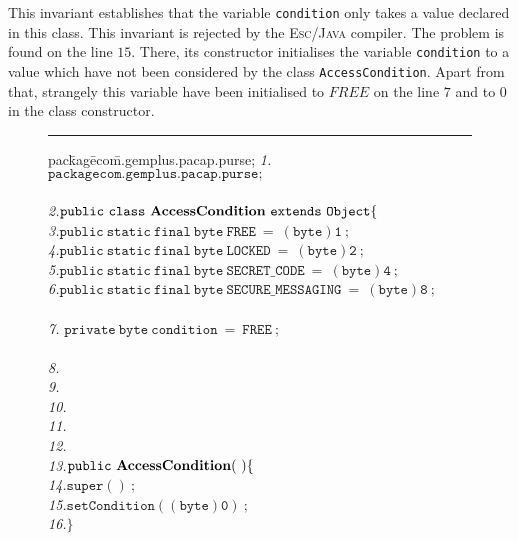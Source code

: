 \documentclass[a4paper]{llncs}
\begin{document}
This invariant establishes that the variable \texttt{condition} only
takes a value declared in this class. This invariant is rejected by
the \textsc{Esc/Java} compiler. The problem is found on the line
$15$. There, its constructor initialises the variable
\texttt{condition} to a value which have not been considered by the
class \texttt{AccessCondition}. Apart from that, strangely this
variable have been initialised to $FREE$ on the line $7$ and to $0$
in the class constructor.




\begin{center}
\begin{figure}[hbt]
\rule{\linewidth}{0.3mm}
\rule{0em}{0.1ex}
\begin{tabbing} 
pac\=kag\=eco\=m.gemplus.pacap.purse; \kill 
\emph{1.}\>$\mathtt{package com.gemplus.pacap.purse;}$\\
\\
\emph{2.}\>$\mathtt{public\ class\ {\bf AccessCondition}\ extends\ Object\{}$\\

\emph{3.}\>\>$\mathtt{public\ static\ final\ byte\ FREE\		=\ (byte)1\ ;}$\\
\emph{4.}\>\>$\mathtt{public\ static\ final\ byte\ LOCKED\		=\ (byte)2\ ;}$\\
\emph{5.}\>\>$\mathtt{public\ static\ final\ byte\ SECRET\_CODE\	=\ (byte)4\ ;}$\\
\emph{6.}\>\>$\mathtt{public\ static\ final\ byte\ SECURE\_MESSAGING\	=\
(byte)8\ ; }$\\
\\
\emph{7.}\> $\mathtt{private\ byte\ condition\ =\ FREE\ ;}$\\
\\
\emph{8.}\>\\
\emph{9.}\>\>\\
\emph{10.}\>\>\\
\emph{11.}\>\>\\
\emph{12.}\>\>{\it */} \\
\emph{13.}\>\>$\mathtt{public\ {\bf AccessCondition}(\ ) \{}$\\
\emph{14.}\>\>\>$\mathtt{super()\ ;}$\\
\emph{15.}\>\>\>$\mathtt{setCondition((byte)0)\ ;}$\\
\emph{16.}\>\>$\mathtt{\}}$\\


\end{tabbing}
\end{figure}
\end{center}
\end{document}
